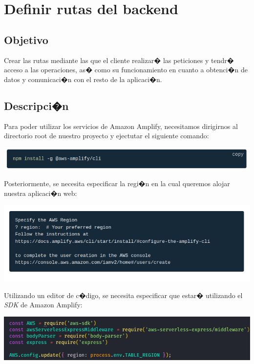 \documentclass[12pt,letterpaper]{article}
\begin{document}
\newpage
\section{Definir rutas del backend} \label{Backend}

\subsection{Objetivo}
Crear las rutas mediante las que el cliente realizar� las peticiones y tendr� acceso a las operaciones, as� como su funcionamiento en cuanto a obtenci�n de datos y comunicaci�n con el resto de la aplicaci�n.
\subsection{Descripci�n}

Para poder utilizar los servicios de Amazon Amplify, necesitamos dirigirnos al directorio root de nuestro proyecto y ejectutar el siguiente comando:

\begin{center}
  \includegraphics[scale=0.6]{imagenes/cli}
 \label{fig:MongoA} 
\end{center} 

Posteriormente, se necesita especificar la regi�n en la cual queremos alojar nuestra aplicaci�n web:

\begin{center}
  \includegraphics[scale=0.6]{imagenes/region}
 \label{fig:MongoA} 
\end{center} 


Utilizando un editor de c�digo, se necesita especificar que estar� utilizando el \emph{SDK} de Amazon Amplify:

\begin{center}
  \includegraphics[scale=0.55]{imagenes/sdk}
 \label{fig:MongoA} 
\end{center} 
\end{document}
